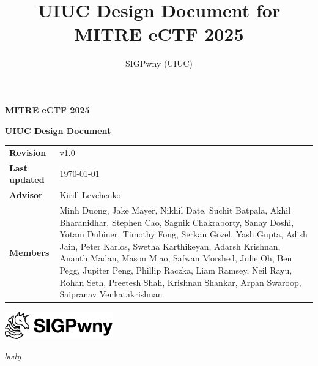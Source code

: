 \documentclass[12pt]{article}
\title{UIUC Design Document for MITRE eCTF 2025}
\author{SIGPwny (UIUC)}
\begin{document}
\pagestyle{plain}
\thispagestyle{empty}

\vspace*{0.3\textheight}

\begin{flushleft}
{\fontsize{48}{52}\selectfont\textbf{MITRE eCTF 2025}}
\par\bigskip
{\fontsize{28}{32}\selectfont\textbf{UIUC Design Document}}
\par\bigskip
\begin{tabularx}{\linewidth}{@{}>{\bfseries}l@{\hspace{.5em}}X@{}}
  Revision & v1.0 \\
  Last updated & \today \\
  Advisor & Kirill Levchenko \\
  Members & \raggedright
    Minh Duong,
    Jake Mayer,
    Nikhil Date,
    Suchit Batpala,
    Akhil Bharanidhar,
    Stephen Cao,
    Sagnik Chakraborty,
    Sanay Doshi,
    Yotam Dubiner,
    Timothy Fong,
    Serkan Gozel,
    Yash Gupta,
    Adish Jain,
    Peter Karlos,
    Swetha Karthikeyan,
    Adarsh Krishnan,
    Ananth Madan,
    Mason Miao,
    Safwan Morshed,
    Julie Oh,
    Ben Pegg,
    Jupiter Peng,
    Phillip Raczka,
    Liam Ramsey,
    Neil Rayu,
    Rohan Seth,
    Preetesh Shah,
    Krishnan Shankar,
    Arpan Swaroop,
    Saipranav Venkatakrishnan
\end{tabularx}

\vspace{\fill}

\includegraphics[width=0.35\textwidth]{assets/pwny8-banner-transparent.pdf}\\
\end{flushleft}

\newpage

\tableofcontents

\newpage

$body$
\end{document}
